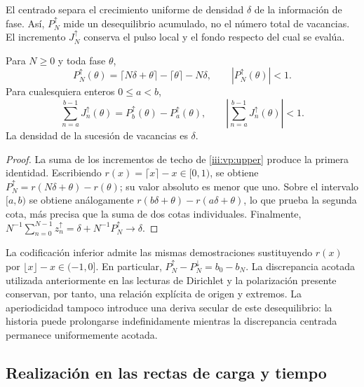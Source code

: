 El centrado separa el crecimiento uniforme de densidad $\delta$ de la
información de fase. Así, $P_N^{\uparrow}$ mide un desequilibrio acumulado,
no el número total de vacancias. El incremento $J_N^{\uparrow}$ conserva
el pulso local y el fondo respecto del cual se evalúa.

\begin{theorem}
Para $N\geq0$ y toda fase $\theta$,
\begin{equation}
 P_N^{\uparrow}(\theta)
 =\lceil N\delta+\theta\rceil-\lceil\theta\rceil-N\delta,
 \qquad |P_N^{\uparrow}(\theta)|<1.
 \label{iii:vp:bound}
\end{equation}
Para cualesquiera enteros $0\leq a<b$,
\begin{equation}
 \sum_{n=a}^{b-1}J_n^{\uparrow}(\theta)
 =P_b^{\uparrow}(\theta)-P_a^{\uparrow}(\theta),
 \qquad
 \left|\sum_{n=a}^{b-1}J_n^{\uparrow}(\theta)\right|<1.
 \label{iii:vp:continuity}
\end{equation}
La densidad de la sucesión de vacancias es $\delta$.
\end{theorem}
\begin{proof}
La suma de los incrementos de techo de \eqref{iii:vp:upper} produce la
primera identidad. Escribiendo $r(x)=\lceil x\rceil-x\in[0,1)$,
se obtiene $P_N^{\uparrow}=r(N\delta+\theta)-r(\theta)$; su valor
absoluto es menor que uno. Sobre el intervalo $[a,b)$ se obtiene
análogamente $r(b\delta+\theta)-r(a\delta+\theta)$, lo que prueba
la segunda cota, más precisa que la suma de dos cotas individuales.
Finalmente,
$N^{-1}\sum_{n=0}^{N-1}z_n^{\uparrow}
=\delta+N^{-1}P_N^{\uparrow}\to\delta$.
\end{proof}

La codificación inferior admite las mismas demostraciones sustituyendo
$r(x)$ por $\lfloor x\rfloor-x\in(-1,0]$. En particular,
$P_N^{\uparrow}-P_N^{\downarrow}=b_0-b_N$. La discrepancia acotada
utilizada anteriormente en las lecturas de Dirichlet y la polarización
presente conservan, por tanto, una relación explícita de origen y extremos.
La aperiodicidad tampoco introduce una deriva secular de este desequilibrio:
la historia puede prolongarse indefinidamente mientras la discrepancia
centrada permanece uniformemente acotada.

\subsection{Realización en las rectas de carga y tiempo}


